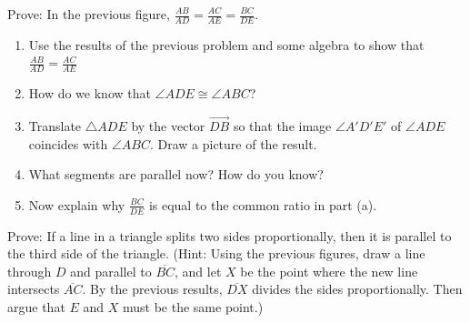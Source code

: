\begin{prob}
Prove:  In the previous figure, $\frac{AB}{AD} = \frac{AC}{AE} = \frac{BC}{DE}$.  
\begin{enumerate}
\item Use the results of the previous problem and some algebra to show that $\frac{AB}{AD} = \frac{AC}{AE}$
\item How do we know that $\angle ADE \cong \angle ABC$?  
\item Translate $\triangle ADE$ by the vector $\overrightarrow{DB}$ so that the image $\angle A'D'E'$ of $\angle ADE$ coincides with $\angle ABC$.  Draw a picture of the result.  
\item What segments are parallel now?  How do you know?  
\item Now explain why $\frac{BC}{DE}$ is equal to the common ratio in part (a).  
\end{enumerate}
\end{prob}

\begin{prob}
Prove:  If a line in a triangle splits two sides proportionally, then it is parallel to the third side of the triangle.  (Hint:  Using the previous figures, draw a line through $D$ and parallel to $\overline{BC}$, and let $X$ be the point where the new line intersects $\overline{AC}$.  By the previous results, $\overline{DX}$ divides the sides proportionally.  Then argue that $E$ and $X$ must be the same point.)  
\end{prob}


